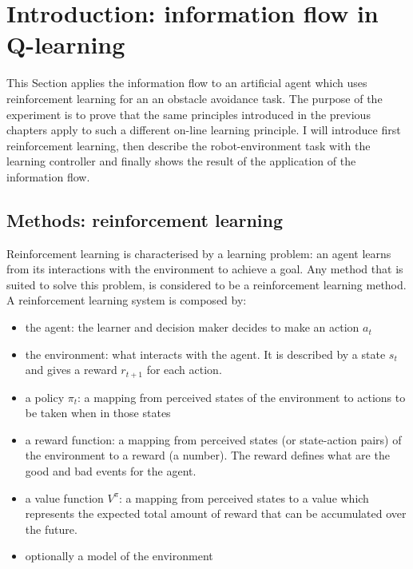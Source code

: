 \section{Introduction: information flow in Q-learning \label{Chapter7:Q learning application}}

This Section applies the information flow to an artificial agent
which uses reinforcement learning for an an obstacle avoidance task.
The purpose of the experiment is to prove that the same principles introduced
in the previous chapters apply to such a different on-line learning principle.
I will introduce first reinforcement learning, then describe the
robot-environment task with the learning controller and finally shows the
result of the application of the information flow.

\subsection{Methods: reinforcement learning }

Reinforcement learning \citep{TD} is characterised by a learning problem: an agent
learns from its interactions with the environment to achieve a goal.
Any method that is suited to solve this problem, is considered to be
a reinforcement learning method.
A reinforcement learning system is composed by:
\begin{itemize}
 \item the agent: the learner and decision maker decides to make an action $a_t$
 \item the environment: what interacts with the agent. It is described by a
state $s_t$ and gives a reward $r_{t+1}$ for each action.
 \item a policy $\pi_t$: a mapping from perceived states of the environment to
actions to be taken when in those states
 \item a reward function: a mapping from perceived states (or state-action pairs)
of the environment to a reward (a number).
The reward defines what are the good and bad events for the agent.
 \item a value function $V^{\pi}$: a mapping from perceived states to a value
which represents the expected total amount of reward that can be accumulated
over the future.
 \item optionally a model of the environment
\end{itemize}

